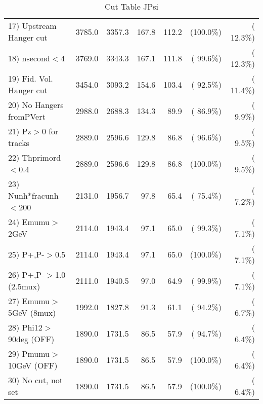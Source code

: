 \begin{table}[h!]
\begin{tabular}{||l||r|r|r|r|r|r||}
 17) Upstream Hanger cut  &       3785.0 &       3357.3 &        167.8 &        112.2 & (100.0\%) & ( 12.3\%) \\
 18) nsecond$<$4          &       3769.0 &       3343.3 &        167.1 &        111.8 & ( 99.6\%) & ( 12.3\%) \\
 19) Fid. Vol. Hanger cut &       3454.0 &       3093.2 &        154.6 &        103.4 & ( 92.5\%) & ( 11.4\%) \\
 20) No Hangers fromPVert &       2988.0 &       2688.3 &        134.3 &         89.9 & ( 86.9\%) & (  9.9\%) \\
 21) Pz$>$0 for tracks    &       2889.0 &       2596.6 &        129.8 &         86.8 & ( 96.6\%) & (  9.5\%) \\
 22) Thprimord$<$0.4      &       2889.0 &       2596.6 &        129.8 &         86.8 & (100.0\%) & (  9.5\%) \\
 23) Nunh*fracunh$<$200   &       2131.0 &       1956.7 &         97.8 &         65.4 & ( 75.4\%) & (  7.2\%) \\
 24) Emumu$>$2GeV         &       2114.0 &       1943.4 &         97.1 &         65.0 & ( 99.3\%) & (  7.1\%) \\
 25) P+,P-$>$0.5          &       2114.0 &       1943.4 &         97.1 &         65.0 & (100.0\%) & (  7.1\%) \\
 26) P+,P-$>$1.0 (2.5mux) &       2111.0 &       1940.5 &         97.0 &         64.9 & ( 99.9\%) & (  7.1\%) \\
 27) Emumu$>$5GeV  (8mux) &       1992.0 &       1827.8 &         91.3 &         61.1 & ( 94.2\%) & (  6.7\%) \\
 28) Phi12$>$90deg  (OFF) &       1890.0 &       1731.5 &         86.5 &         57.9 & ( 94.7\%) & (  6.4\%) \\
 29) Pmumu$>$10GeV  (OFF) &       1890.0 &       1731.5 &         86.5 &         57.9 & (100.0\%) & (  6.4\%) \\
 30) No cut, not set      &       1890.0 &       1731.5 &         86.5 &         57.9 & (100.0\%) & (  6.4\%) \\
 \hline
 \hline
 \end{tabular}
 \caption{Cut Table  JPsi     }
 \label{tab-cutcohjpsi-mumu_cohrhop}
 \end{table}
